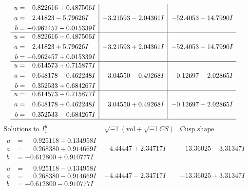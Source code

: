 \documentclass[1p]{elsarticle_modified}
\theoremstyle{definition}
\newcommand{\I}{\sqrt{-1}}
\begin{document}
$$\begin{array}{c|c|c}
\begin{aligned}
u &= \phantom{-}0.822616 + 0.487506 I \\
a &= \phantom{-}2.41823 - 5.79626 I \\
b &= -0.962457 - 0.015339 I\end{aligned}
 & -3.21593 - 2.04361 I & -52.4053 - 14.7990 I \\ \hline\begin{aligned}
u &= \phantom{-}0.822616 - 0.487506 I \\
a &= \phantom{-}2.41823 + 5.79626 I \\
b &= -0.962457 + 0.015339 I\end{aligned}
 & -3.21593 + 2.04361 I & -52.4053 + 14.7990 I \\ \hline\begin{aligned}
u &= \phantom{-}0.614573 + 0.715877 I \\
a &= \phantom{-}0.648178 - 0.462248 I \\
b &= \phantom{-}0.352533 + 0.684267 I\end{aligned}
 & \phantom{-}3.04550 - 0.49268 I & -0.12697 + 2.02865 I \\ \hline\begin{aligned}
u &= \phantom{-}0.614573 - 0.715877 I \\
a &= \phantom{-}0.648178 + 0.462248 I \\
b &= \phantom{-}0.352533 - 0.684267 I\end{aligned}
 & \phantom{-}3.04550 + 0.49268 I & -0.12697 - 2.02865 I\\
 \hline 
 \end{array}$$\newpage$$\begin{array}{c|c|c}  
\text{Solutions to }I^u_{1}& \I (\text{vol} + \sqrt{-1}CS) & \text{Cusp shape}\\
 \hline 
\begin{aligned}
u &= \phantom{-}0.925118 + 0.134958 I \\
a &= \phantom{-}0.268380 + 0.914669 I \\
b &= -0.612800 + 0.910777 I\end{aligned}
 & -4.44447 + 2.34717 I & -13.36025 - 3.31347 I \\ \hline\begin{aligned}
u &= \phantom{-}0.925118 - 0.134958 I \\
a &= \phantom{-}0.268380 - 0.914669 I \\
b &= -0.612800 - 0.910777 I\end{aligned}
 & -4.44447 - 2.34717 I & -13.36025 + 3.31347 I \\ \hline\begin{aligned}

\end{aligned}
\end{array}$$
\end{document}
